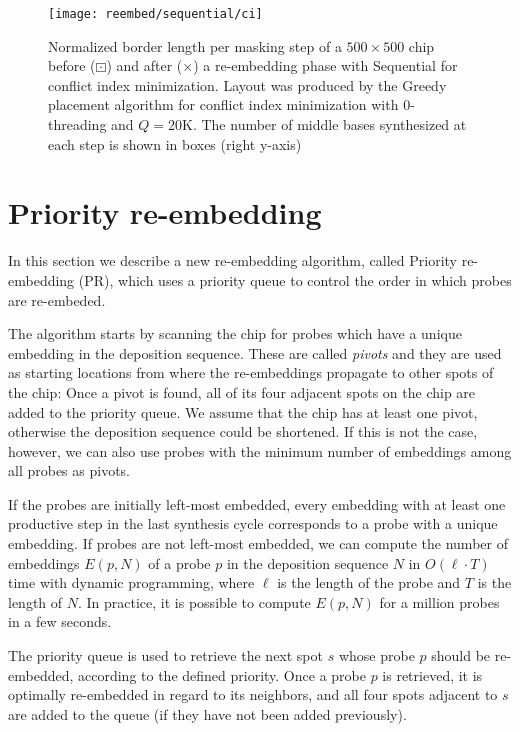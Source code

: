 \begin{figure}[t]\centering
\texttt{[image: reembed/sequential/ci]}
\caption{\label{fig:sequential-ci_blm}
  Normalized border length per masking step of a $500\times 500$ chip before
  ({\tiny $\boxdot$}) and after ({\tiny $\times$}) a re-embedding phase with
  Sequential for conflict index minimization. Layout was produced by the Greedy
  placement algorithm for conflict index minimization with $0$-threading and
  $Q=20$K. The number of middle bases synthesized at each step is shown in boxes
  (right y-axis)}
\end{figure}

\section{Priority re-embedding}
\label{sec:reembed_priority}

In this section we describe a new re-embedding algorithm, called Priority
re-embedding (PR), which uses a priority queue to control the order in which
probes are re-embeded.

The algorithm starts by scanning the chip for probes which have a unique
embedding in the deposition sequence. These are called \emph{pivots} and
they are used as starting locations from where the re-embeddings propagate to
other spots of the chip: Once a pivot is found, all of its four adjacent
spots on the chip are added to the priority queue. We assume that the chip
has at least one pivot, otherwise the deposition sequence could be shortened. If
this is not the case, however, we can also use probes with the minimum number of
embeddings among all probes as pivots.

If the probes are initially left-most embedded, every embedding with at least
one productive step in the last synthesis cycle corresponds to a probe with a
unique embedding. If probes are not left-most embedded, we can compute the
number of embeddings $E(p,N)$ of a probe $p$ in the deposition sequence $N$ in
$O(\ell \cdot T)$ time with dynamic programming, where $\ell$ is the length of
the probe and $T$ is the length of $N$. In practice, it is possible to compute
$E(p,N)$ for a million probes in a few seconds.

The priority queue is used to retrieve the next spot $s$ whose probe $p$ should
be re-embedded, according to the defined priority. Once a probe $p$ is
retrieved, it is optimally re-embedded in regard to its neighbors, and all four
spots adjacent to $s$ are added to the queue (if they have not been added
previously).


